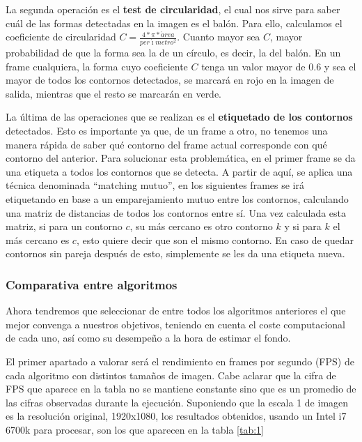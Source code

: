 La segunda operación es el \textbf{test de circularidad}, el cual nos sirve para saber cuál de las formas detectadas en la imagen es el balón. Para ello, calculamos el coeficiente de circularidad $C =  \frac{4*\pi*\acute{a}rea}{per\acute{\imath}metro^2}$. Cuanto mayor sea $C$, mayor probabilidad de que la forma sea la de un círculo, es decir, la del balón. En un frame cualquiera, la forma cuyo coeficiente $C$ tenga un valor mayor de 0.6 y sea el mayor de todos los contornos detectados, se marcará en rojo en la imagen de salida, mientras que el resto se marcarán en verde.

La última de las operaciones que se realizan es el \textbf{etiquetado de los contornos} detectados. Esto es importante ya que, de un frame a otro, no tenemos una manera rápida de saber qué contorno del frame actual corresponde con qué contorno del anterior. Para solucionar esta problemática, en el primer frame se da una etiqueta a todos los contornos que se detecta. A partir de aquí, se aplica una técnica denominada ``matching mutuo'', en los siguientes frames se irá etiquetando en base a un emparejamiento mutuo entre los contornos, calculando una matriz de distancias de todos los contornos entre sí. Una vez calculada esta matriz, si para un contorno $c$, su más cercano es otro contorno $k$ y si para $k$ el más cercano es $c$, esto quiere decir que son el mismo contorno. En caso de quedar contornos sin pareja después de esto, simplemente se les da una etiqueta nueva.

\subsubsection*{Comparativa entre algoritmos}

Ahora tendremos que seleccionar de entre todos los algoritmos anteriores el que mejor convenga a nuestros objetivos, teniendo en cuenta el coste computacional de cada uno, así como su desempeño a la hora de estimar el fondo.

El primer apartado a valorar será el rendimiento en frames por segundo (FPS) de cada algoritmo con distintos tamaños de imagen. Cabe aclarar que la cifra de FPS que aparece en la tabla no se mantiene constante sino que es un promedio de las cifras observadas durante la ejecución. Suponiendo que la escala 1 de imagen es la resolución original, 1920x1080, los resultados obtenidos, usando un Intel i7 6700k para procesar, son los que aparecen en la tabla \ref{tab:1}

